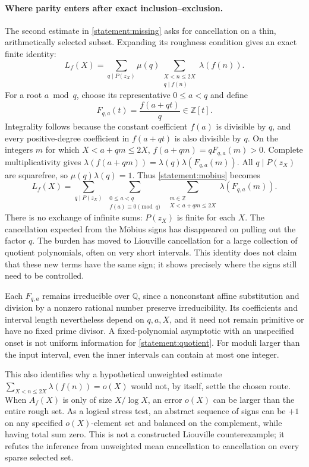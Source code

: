 \documentclass[11pt]{article}
\newcommand{\Z}{\mathbb{Z}}
\newcommand{\Q}{\mathbb{Q}}
\begin{document}
\paragraph{Where parity enters after exact inclusion--exclusion.}
The second estimate in \eqref{statement:missing} asks for cancellation on a
thin, arithmetically selected subset. Expanding its roughness condition gives
an exact finite identity:
\begin{equation}\label{statement:mobius}
 L_f(X)=\sum_{q\mid P(z_X)}\mu(q)
           \sum_{\substack{X<n\le2X\\q\mid f(n)}}\lambda(f(n)).
\end{equation}
For a root $a\bmod q$, choose its representative $0\le a<q$ and define
\[
 F_{q,a}(t)=\frac{f(a+qt)}q\in\Z[t].
\]
Integrality follows because the constant coefficient $f(a)$ is divisible by
$q$, and every positive-degree coefficient in $f(a+qt)$ is also divisible
by $q$. On the integers $m$ for which $X<a+qm\le2X$,
$f(a+qm)=qF_{q,a}(m)>0$. Complete multiplicativity gives
$\lambda(f(a+qm))=\lambda(q)\lambda(F_{q,a}(m))$.
All $q\mid P(z_X)$ are squarefree, so $\mu(q)\lambda(q)=1$.
Thus \eqref{statement:mobius} becomes
\begin{equation}\label{statement:quotient}
 L_f(X)=
 \sum_{q\mid P(z_X)}
 \ \sum_{\substack{0\le a<q\\ f(a)\equiv0\pmod q}}
 \ \sum_{\substack{m\in\Z\\X<a+qm\le2X}}
        \lambda(F_{q,a}(m)).
\end{equation}
There is no exchange of infinite sums: $P(z_X)$ is finite for each $X$.
The cancellation expected from the M\"obius signs has disappeared on pulling
out the factor $q$. The burden has moved to Liouville cancellation for a
large collection of quotient polynomials, often on very short intervals.
This identity does not claim that these new terms have the same sign; it
shows precisely where the signs still need to be controlled.

Each $F_{q,a}$ remains irreducible over $\Q$, since a nonconstant affine
substitution and division by a nonzero rational number preserve
irreducibility. Its coefficients and interval length nevertheless depend on
$q,a,X$, and it need not remain primitive or have no fixed prime divisor.
A fixed-polynomial asymptotic with an unspecified onset is not uniform
information for \eqref{statement:quotient}. For moduli larger than the input
interval, even the inner intervals can contain at most one integer.

This also identifies why a hypothetical unweighted estimate
$\sum_{X<n\le2X}\lambda(f(n))=o(X)$ would not, by itself, settle the chosen
route. When $A_f(X)$ is only of size $X/\log X$, an error $o(X)$ can be larger
than the entire rough set. As a logical stress test, an abstract sequence of
signs can be $+1$ on any specified $o(X)$-element set and balanced on the
complement, while having total sum zero. This is not a constructed Liouville
counterexample; it refutes the inference from unweighted mean cancellation
to cancellation on every sparse selected set.
\end{document}
